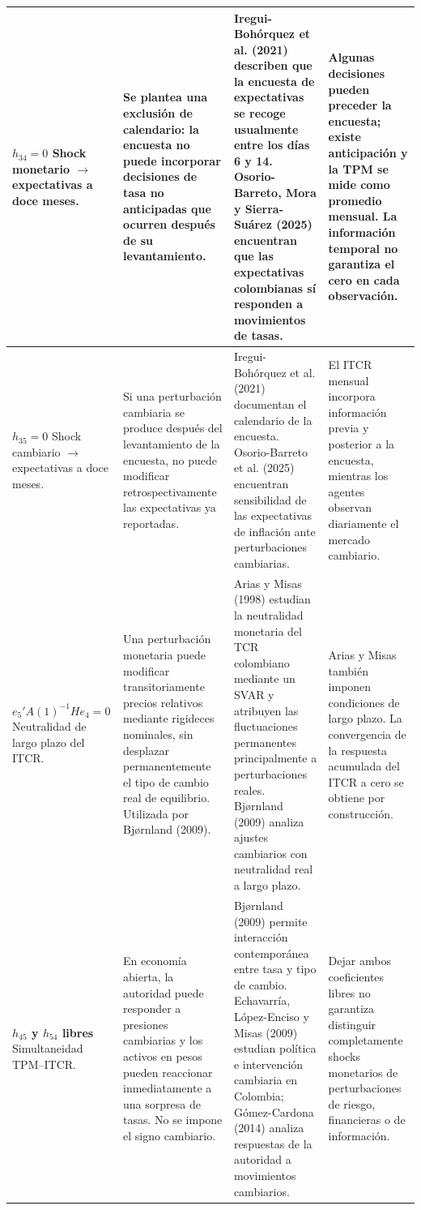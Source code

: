 \documentclass[12pt,letterpaper]{article}
\begin{document}
\begin{longtable}{@{}>{\raggedright\arraybackslash}p{}>{\raggedright\arraybackslash}p{}>{\raggedright\arraybackslash}p{}>{\raggedright\arraybackslash}p{}@{}}
\textbf{$h_{34}=0$}\newline
Shock monetario $\rightarrow$ expectativas a doce meses.
& Se plantea una exclusión de calendario: la encuesta no puede incorporar decisiones de tasa no anticipadas que ocurren después de su levantamiento.
& Iregui-Bohórquez et al. (2021) describen que la encuesta de expectativas se recoge usualmente entre los días 6 y 14. Osorio-Barreto, Mora y Sierra-Suárez (2025) encuentran que las expectativas colombianas sí responden a movimientos de tasas.
& Algunas decisiones pueden preceder la encuesta; existe anticipación y la TPM se mide como promedio mensual. La información temporal no garantiza el cero en cada observación.\\
\midrule

\textbf{$h_{35}=0$}\newline
Shock cambiario $\rightarrow$ expectativas a doce meses.
& Si una perturbación cambiaria se produce después del levantamiento de la encuesta, no puede modificar retrospectivamente las expectativas ya reportadas.
& Iregui-Bohórquez et al. (2021) documentan el calendario de la encuesta. Osorio-Barreto et al. (2025) encuentran sensibilidad de las expectativas de inflación ante perturbaciones cambiarias.
& El ITCR mensual incorpora información previa y posterior a la encuesta, mientras los agentes observan diariamente el mercado cambiario.\\
\midrule

\textbf{$e_5'A(1)^{-1}He_4=0$}\newline
Neutralidad de largo plazo del ITCR.
& Una perturbación monetaria puede modificar transitoriamente precios relativos mediante rigideces nominales, sin desplazar permanentemente el tipo de cambio real de equilibrio. Utilizada por Bj{\o}rnland (2009).
& Arias y Misas (1998) estudian la neutralidad monetaria del TCR colombiano mediante un SVAR y atribuyen las fluctuaciones permanentes principalmente a perturbaciones reales. Bj{\o}rnland (2009) analiza ajustes cambiarios con neutralidad real a largo plazo.
& Arias y Misas también imponen condiciones de largo plazo. La convergencia de la respuesta acumulada del ITCR a cero se obtiene por construcción.\\
\midrule

\textbf{$h_{45}$ y $h_{54}$ libres}\newline
Simultaneidad TPM--ITCR.
& En economía abierta, la autoridad puede responder a presiones cambiarias y los activos en pesos pueden reaccionar inmediatamente a una sorpresa de tasas. No se impone el signo cambiario.
& Bj{\o}rnland (2009) permite interacción contemporánea entre tasa y tipo de cambio. Echavarría, López-Enciso y Misas (2009) estudian política e intervención cambiaria en Colombia; Gómez-Cardona (2014) analiza respuestas de la autoridad a movimientos cambiarios.
& Dejar ambos coeficientes libres no garantiza distinguir completamente shocks monetarios de perturbaciones de riesgo, financieras o de información.\\
\midrule


\end{longtable}
\end{document}
